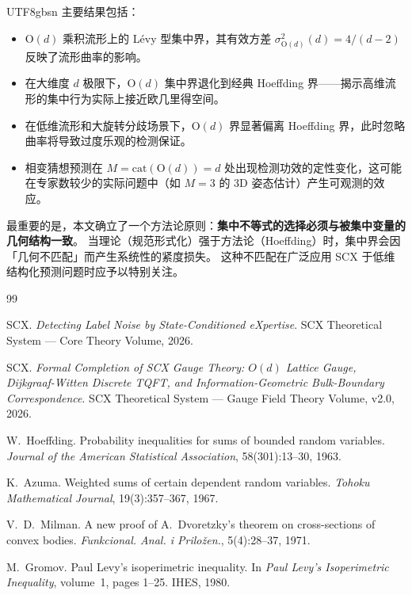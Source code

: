 \documentclass[12pt,a4paper]{article}
\theoremstyle{plain}
\theoremstyle{definition}
\theoremstyle{remark}
\newcommand{\Od}{\mathrm{O}(d)}
\begin{document}
\begin{CJK}{UTF8}{gbsn}
主要结果包括：
\begin{itemize}
    \item $\Od$ 乘积流形上的 L\'{e}vy 型集中界，其有效方差 $\sigma_{\Od}^2(d) = 4/(d-2)$ 反映了流形曲率的影响。
    \item 在大维度 $d$ 极限下，$\Od$ 集中界退化到经典 Hoeffding 界——揭示高维流形的集中行为实际上接近欧几里得空间。
    \item 在低维流形和大旋转分歧场景下，$\Od$ 界显著偏离 Hoeffding 界，此时忽略曲率将导致过度乐观的检测保证。
    \item 相变猜想预测在 $M = \mathrm{cat}(\Od) = d$ 处出现检测功效的定性变化，这可能在专家数较少的实际问题中（如 $M=3$ 的 3D 姿态估计）产生可观测的效应。
\end{itemize}

最重要的是，本文确立了一个方法论原则：\textbf{集中不等式的选择必须与被集中变量的几何结构一致}。
当理论（规范形式化）强于方法论（Hoeffding）时，集中界会因「几何不匹配」而产生系统性的紧度损失。
这种不匹配在广泛应用 SCX 于低维结构化预测问题时应予以特别关注。

\newpage

\begin{thebibliography}{99}

SCX. \textit{Detecting Label Noise by State-Conditioned eXpertise}. SCX Theoretical System — Core Theory Volume, 2026.

SCX. \textit{Formal Completion of SCX Gauge Theory: $O(d)$ Lattice Gauge, Dijkgraaf-Witten Discrete TQFT, and Information-Geometric Bulk-Boundary Correspondence}. SCX Theoretical System — Gauge Field Theory Volume, v2.0, 2026.

W.~Hoeffding. Probability inequalities for sums of bounded random variables. \textit{Journal of the American Statistical Association}, 58(301):13--30, 1963.

K.~Azuma. Weighted sums of certain dependent random variables. \textit{Tohoku Mathematical Journal}, 19(3):357--367, 1967.

V.~D.~Milman. A new proof of A.~Dvoretzky's theorem on cross-sections of convex bodies. \textit{Funkcional. Anal. i Prilo\v{z}en.}, 5(4):28--37, 1971.

M.~Gromov. Paul Levy's isoperimetric inequality. In \textit{Paul Levy's Isoperimetric Inequality}, volume~1, pages 1--25. IHES, 1980.


\end{thebibliography}
\end{CJK}
\end{document}
